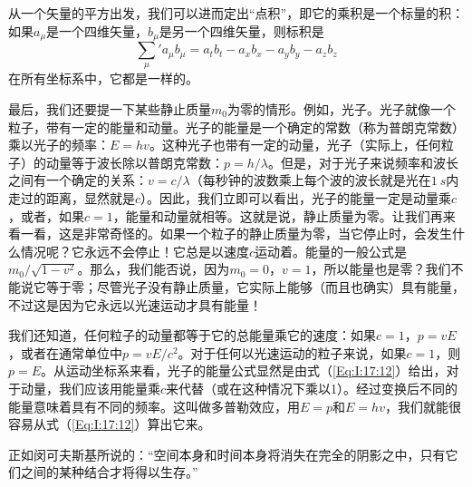 从一个矢量的平方出发，我们可以进而定出“点积”，即它的乘积是一个标量的积：如果$a_\mu$是一个四维矢量，$b_\mu$是另一个四维矢量，则标积是
\begin{equation}
    \label{Eq:I:17:16}
    {\sum_{\mu}}' a_\mu b_\mu = a_tb_t - a_xb_x - a_yb_y - a_zb_z 
\end{equation}
在所有坐标系中，它都是一样的。

最后，我们还要提一下某些静止质量$m_0$为零的情形。例如，光子。光子就像一个粒子，带有一定的能量和动量。光子的能量是一个确定的常数（称为普朗克常数）乘以光子的频率：$E=hv$。这种光子也带有一定的动量，光子（实际上，任何粒子）的动量等于波长除以普朗克常数：$p=h/\lambda$。但是，对于光子来说频率和波长之间有一个确定的关系：$v=c/\lambda$（每秒钟的波数乘上每个波的波长就是光在$1~s$内走过的距离，显然就是$c$）。因此，我们立即可以看出，光子的能量一定是动量乘$c$，或者，如果$c=1$，能量和动量就相等。这就是说，静止质量为零。让我们再来看一看，这是非常奇怪的。如果一个粒子的静止质量为零，当它停止时，会发生什么情况呢？它永远不会停止！它总是以速度$c$运动着。能量的一般公式是$m_0/\sqrt{1-v^2}$。那么，我们能否说，因为$m_0=0$，$v=1$，所以能量也是零？我们不能说它等于零；尽管光子没有静止质量，它实际上能够（而且也确实）具有能量，不过这是因为它永远以光速运动才具有能量！

我们还知道，任何粒子的动量都等于它的总能量乘它的速度：如果$c=1$，$p=vE$，或者在通常单位中$p=vE/c^2$。对于任何以光速运动的粒子来说，如果$c=1$，则$p=E$。从运动坐标系来看，光子的能量公式显然是由式（\ref{Eq:I:17:12}）给出，对于动量，我们应该用能量乘$c$来代替（或在这种情况下乘以1）。经过变换后不同的能量意味着具有不同的频率。这叫做多普勒效应，用$E=p$和$E=hv$，我们就能很容易从式（\ref{Eq:I:17:12}）算出它来。

正如闵可夫斯基所说的：“空间本身和时间本身将消失在完全的阴影之中，只有它们之间的某种结合才将得以生存。”